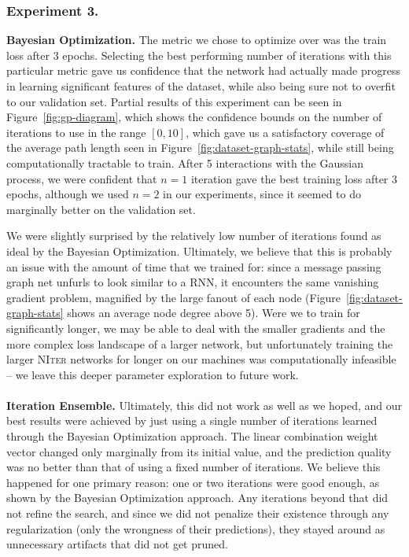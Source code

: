 \subsubsection{Experiment 3.}
\textbf{Bayesian Optimization.}
The metric we chose to optimize over was the train loss after 3 epochs.
Selecting the best performing number of iterations with this particular metric gave us confidence that the network had actually made progress in learning significant features of the dataset, while also being sure not to overfit to our validation set.
Partial results of this experiment can be seen in Figure~\ref{fig:gp-diagram}, which shows the confidence bounds on the number of iterations to use in the range $[0, 10]$, which gave us a satisfactory coverage of the average path length seen in Figure~\ref{fig:dataset-graph-stats}, while still being computationally tractable to train.
After 5 interactions with the Gaussian process, we were confident that $n=1$ iteration gave the best training loss after 3 epochs, although we used $n=2$ in our experiments, since it seemed to do marginally better on the validation set.

We were slightly surprised by the relatively low number of iterations found as ideal by the Bayesian Optimization.
Ultimately, we believe that this is probably an issue with the amount of time that we trained for: since a message passing graph net unfurls to look similar to a RNN, it encounters the same vanishing gradient problem, magnified by the large fanout of each node (Figure~\ref{fig:dataset-graph-stats} shows an average node degree above 5).
Were we to train for significantly longer, we may be able to deal with the smaller gradients and the more complex loss landscape of a larger network, but unfortunately training the larger \textsc{NIter} networks for longer on our machines was computationally infeasible -- we leave this deeper parameter exploration to future work.
\\~\\
\textbf{Iteration Ensemble.}
Ultimately, this did not work as well as we hoped, and our best results were achieved by just using a single number of iterations learned through the Bayesian Optimization approach.
The linear combination weight vector changed only marginally from its initial value, and the prediction quality was no better than that of using a fixed number of iterations.
We believe this happened for one primary reason: one or two iterations were good enough, as shown by the Bayesian Optimization approach.
Any iterations beyond that did not refine the search, and since we did not penalize their existence through any regularization (only the wrongness of their predictions), they stayed around as unnecessary artifacts that did not get pruned.
